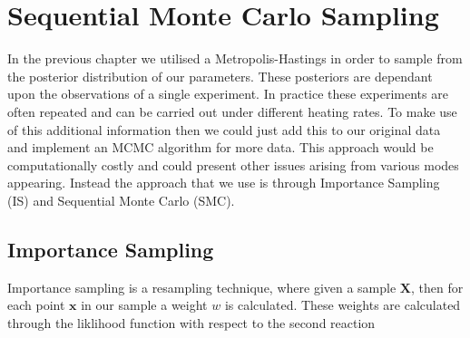 \chapter{Sequential Monte Carlo Sampling}
In the previous chapter we utilised a Metropolis-Hastings in order to sample from the posterior distribution of our parameters. These posteriors are dependant upon the observations of a single experiment. In practice these experiments are often repeated and can be carried out under different heating rates. To make use of this additional information then we could just add this to our original data and implement an MCMC algorithm for more data. This approach would be computationally costly and could present other issues arising from various modes appearing. Instead the approach that we use is through Importance Sampling (IS) and Sequential Monte Carlo (SMC).\\

\section{Importance Sampling}
Importance sampling is a resampling technique, where given a sample $\textbf{X}$, then for each point $\textbf{x}$ in our sample a weight $w$ is calculated. These weights are calculated through the liklihood function with respect to the second reaction  